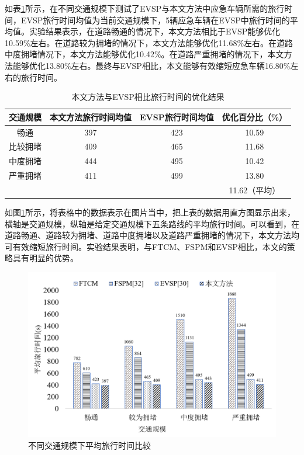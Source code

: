 如表\ref{table:travel_time_my_ISPM}所示，在不同交通规模下测试了EVSP与本文方法中应急车辆所需的旅行时间，EVSP旅行时间均值为当前交通规模下，5辆应急车辆在EVSP中旅行时间的平均值。实验结果表示，在道路畅通的情况下，本文方法相比于EVSP能够优化10.59\%左右。在道路较为拥堵的情况下，本文方法能够优化11.68\%左右。在道路中度拥堵情况下，本文方法能够优化10.42\%。在道路严重拥堵的情况下，本文方法能够优化13.80\%左右。最终与EVSP相比，本文能够有效缩短应急车辆16.80\%左右的旅行时间。

\begin{table}[H]
	\centering
	\caption{本文方法与EVSP相比旅行时间的优化结果}
	\label{table:travel_time_my_ISPM}
	\begin{tabular}{|c|c|c|c|}
		\hline
		交通规模	& 本文方法旅行时间均值 & EVSP旅行时间均值\cite{qin_control_2012} & 优化百分比（\%） \\ \hline
		畅通		  & 397     & 423           & 10.59           \\ \hline
		比较拥堵	& 409     & 465           & 11.68           \\ \hline
		中度拥堵	& 444     & 495           & 10.42           \\ \hline
		严重拥堵	& 411     & 499           & 13.80           \\ \hline
		  &  &  & 11.62（平均） \\ \hline
	\end{tabular}
\end{table}

如图\ref{fig:ave_travel_time}所示，将表格中的数据表示在图片当中，把上表的数据用直方图显示出来，横轴是交通规模，纵轴是给定交通规模下五条路线的平均旅行时间。可以看到，在道路畅通、道路较为拥堵、道路中度拥堵以及道路严重拥堵的情况下，本文方法均可有效缩短旅行时间。实验结果表明，与FTCM、FSPM和EVSP相比，本文的策略具有明显的优势。

\begin{figure}[H]
	\centering
	\includegraphics[width=\linewidth]{figures/ave_travel_time.png}
	\caption{不同交通规模下平均旅行时间比较}
	\label{fig:ave_travel_time}
\end{figure}


